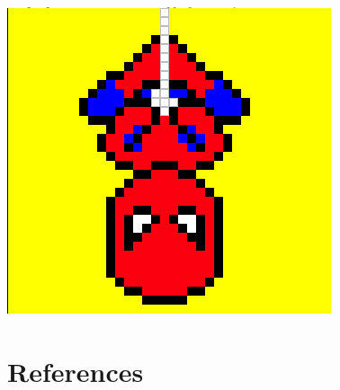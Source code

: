 \documentclass[9pt,b5paper]{article}
\begin{document}
\includegraphics[width=.9\linewidth]{./pic/Screen_Shot_2016-05-26_at_8_47_47_PM.png}

\section{References}
\label{sec-2}
\end{document}
